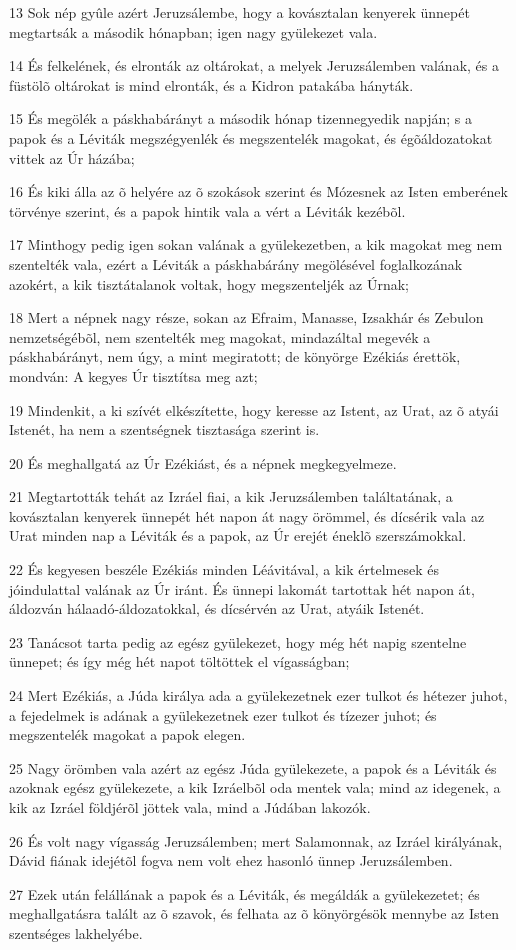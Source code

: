 \par 13 Sok nép gyûle azért Jeruzsálembe, hogy a kovásztalan kenyerek ünnepét megtartsák a második hónapban; igen nagy gyülekezet vala.
\par 14 És felkelének, és elronták az oltárokat, a melyek Jeruzsálemben valának, és a füstölõ oltárokat is mind elronták, és a Kidron patakába hányták.
\par 15 És megölék a páskhabárányt a második hónap tizennegyedik napján; s a papok és a Léviták megszégyenlék és megszentelék magokat, és égõáldozatokat vittek az Úr házába;
\par 16 És kiki álla az õ helyére az õ szokások szerint és Mózesnek az Isten emberének törvénye szerint, és a papok hintik vala a vért a Léviták kezébõl.
\par 17 Minthogy pedig igen sokan valának a gyülekezetben, a kik magokat meg nem szentelték vala, ezért a Léviták a páskhabárány megölésével foglalkozának azokért, a kik tisztátalanok voltak, hogy megszenteljék az Úrnak;
\par 18 Mert a népnek nagy része, sokan az Efraim, Manasse, Izsakhár és Zebulon nemzetségébõl, nem szentelték meg magokat, mindazáltal megevék a páskhabárányt, nem úgy, a mint megiratott; de könyörge Ezékiás érettök, mondván: A kegyes Úr tisztítsa meg azt;
\par 19 Mindenkit, a ki szívét elkészítette, hogy keresse az Istent, az Urat, az õ atyái Istenét, ha nem a szentségnek tisztasága szerint is.
\par 20 És meghallgatá az Úr Ezékiást, és a népnek megkegyelmeze.
\par 21 Megtartották tehát az Izráel fiai, a kik Jeruzsálemben találtatának, a kovásztalan kenyerek ünnepét hét napon át nagy örömmel, és dícsérik vala az Urat minden nap a Léviták és a papok, az Úr erejét éneklõ szerszámokkal.
\par 22 És kegyesen beszéle Ezékiás minden Léávitával, a kik értelmesek és jóindulattal valának az Úr iránt. És ünnepi lakomát tartottak hét napon át, áldozván hálaadó-áldozatokkal, és dícsérvén az Urat, atyáik Istenét.
\par 23 Tanácsot tarta pedig az egész gyülekezet, hogy még hét napig szentelne ünnepet; és így még hét napot töltöttek el vígasságban;
\par 24 Mert Ezékiás, a Júda királya ada a gyülekezetnek ezer tulkot és hétezer juhot, a fejedelmek is adának a gyülekezetnek ezer tulkot és tízezer juhot; és megszentelék magokat a papok elegen.
\par 25 Nagy örömben vala azért az egész Júda gyülekezete, a papok és a Léviták és azoknak egész gyülekezete, a kik Izráelbõl oda mentek vala; mind az idegenek, a kik az Izráel földjérõl jöttek vala, mind a Júdában lakozók.
\par 26 És volt nagy vígasság Jeruzsálemben; mert Salamonnak, az Izráel királyának, Dávid fiának idejétõl fogva nem volt ehez hasonló ünnep Jeruzsálemben.
\par 27 Ezek után felállának a papok és a Léviták, és megáldák a gyülekezetet; és meghallgatásra talált az õ szavok, és felhata az õ könyörgésök mennybe az Isten szentséges lakhelyébe.

